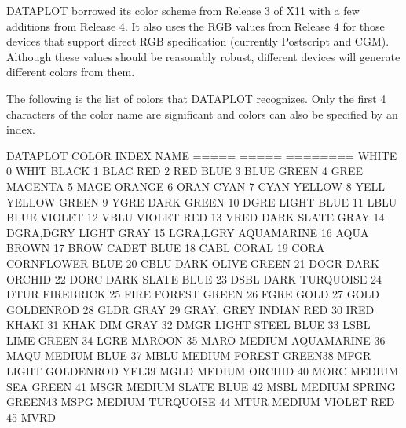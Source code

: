 DATAPLOT borrowed its color scheme from Release 3 of X11 with a few
additions from Release 4.  It also uses the RGB values from Release 4
for those devices that support direct RGB specification (currently
Postscript and CGM).  Although these values should be reasonably
robust, different devices will generate different colors from them.
 
The following is the list of colors that DATAPLOT recognizes.  Only the
first 4 characters of the color name are significant and colors can
also be specified by an index.
 
 
                                    DATAPLOT
        COLOR             INDEX     NAME
        =====             =====     ========
        WHITE               0       WHIT
        BLACK               1       BLAC
        RED                 2       RED
        BLUE                3       BLUE
        GREEN               4       GREE
        MAGENTA             5       MAGE
        ORANGE              6       ORAN
        CYAN                7       CYAN
        YELLOW              8       YELL
        YELLOW GREEN        9       YGRE
        DARK GREEN         10       DGRE
        LIGHT BLUE         11       LBLU
        BLUE VIOLET        12       VBLU
        VIOLET RED         13       VRED
        DARK SLATE GRAY    14       DGRA,DGRY
        LIGHT GRAY         15       LGRA,LGRY
        AQUAMARINE         16       AQUA
        BROWN              17       BROW
        CADET BLUE         18       CABL
        CORAL              19       CORA
        CORNFLOWER BLUE    20       CBLU
        DARK OLIVE GREEN   21       DOGR
        DARK ORCHID        22       DORC
        DARK SLATE BLUE    23       DSBL
        DARK TURQUOISE     24       DTUR
        FIREBRICK          25       FIRE
        FOREST GREEN       26       FGRE
        GOLD               27       GOLD
        GOLDENROD          28       GLDR
        GRAY               29       GRAY, GREY
        INDIAN RED         30       IRED
        KHAKI              31       KHAK
        DIM GRAY           32       DMGR
        LIGHT STEEL BLUE   33       LSBL
        LIME GREEN         34       LGRE
        MAROON             35       MARO
        MEDIUM AQUAMARINE  36       MAQU
        MEDIUM BLUE        37       MBLU
        MEDIUM FOREST GREEN38       MFGR
        LIGHT GOLDENROD YEL39       MGLD
        MEDIUM ORCHID      40       MORC
        MEDIUM SEA GREEN   41       MSGR
        MEDIUM SLATE BLUE  42       MSBL
        MEDIUM SPRING GREEN43       MSPG
        MEDIUM TURQUOISE   44       MTUR
        MEDIUM VIOLET RED  45       MVRD
